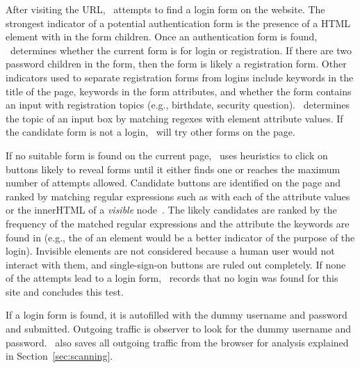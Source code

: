  
 After visiting the URL, \SwapScan\ attempts to find a login form on the website. 
The strongest indicator of a potential authentication form is the presence of a HTML element with  in the form children. Once an authentication form is found, \SwapScan\ determines whether the current form is for login or registration. If there are two password children in the form, then the form is likely a registration form. Other indicators used to separate registration forms from logins include keywords in the title of the page, keywords in the form attributes, and whether the form contains an input with registration topics (e.g., birthdate, security question). \SwapScan\ determines the topic of an input box by matching regexes with element attribute values.  If the candidate form is not a login, \SwapScan\ will try other forms on the page.


If no suitable form is found on the current page, \SwapScan\ uses heuristics to click on buttons likely to reveal forms until it either finds one or reaches the maximum number of attempts allowed. Candidate buttons are identified on the page and ranked by matching regular expressions such as \code{[Ll][Oo][Gg][liOo][Nn]} with each of the attribute values or the innerHTML of a \textit{visible} node~\cite{Zhou2014}. The likely candidates are ranked by the frequency of the matched regular expressions and the attribute the keywords are found in (e.g., the  of an element would be a better indicator of the purpose of the login).  Invisible elements are not considered because a human user would not interact with them, and single-sign-on buttons are ruled out completely. If none of the attempts lead to a login form, \SwapScan\ records that no login was found for this site and concludes this test.

 If a login form is found, it is autofilled with the dummy username and password and submitted.  Outgoing traffic is observer to look for the dummy username and password.  \SwapScan\ also saves all outgoing traffic from the browser for analysis explained in Section~\ref{sec:scanning}.   

